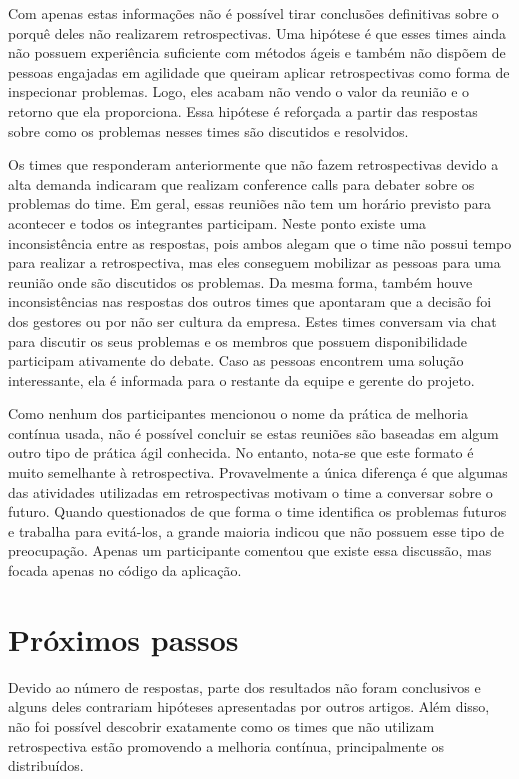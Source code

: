 \documentclass[12pt]{article}
\begin{document}
Com apenas estas informações não é possível tirar conclusões definitivas sobre o porquê deles não realizarem retrospectivas. Uma hipótese é que esses times ainda não possuem experiência suficiente com métodos ágeis e também não dispõem de pessoas engajadas em agilidade que queiram aplicar retrospectivas como forma de inspecionar problemas. Logo, eles acabam não vendo o valor da reunião e o retorno que ela proporciona. Essa hipótese é reforçada a partir das respostas sobre como os problemas nesses times são discutidos e resolvidos.

Os times que responderam anteriormente que não fazem retrospectivas devido a alta demanda indicaram que realizam conference calls para debater sobre os problemas do time. Em geral, essas reuniões não tem um horário previsto para acontecer e todos os integrantes participam. Neste ponto existe uma inconsistência entre as respostas, pois ambos alegam que o time não possui tempo para realizar a retrospectiva, mas eles conseguem mobilizar as pessoas para uma reunião onde são discutidos os problemas. Da mesma forma, também houve inconsistências nas respostas dos outros times que apontaram que a decisão foi dos gestores ou por não ser cultura da empresa. Estes times conversam via chat para discutir os seus problemas e os membros que possuem disponibilidade participam ativamente do debate. Caso as pessoas encontrem uma solução interessante, ela é informada para o restante da equipe e gerente do projeto.

Como nenhum dos participantes mencionou o nome da prática de melhoria contínua usada, não é possível concluir se estas reuniões são baseadas em algum outro tipo de prática ágil conhecida. No entanto, nota-se que este formato é muito semelhante à retrospectiva. Provavelmente a única diferença é que algumas das atividades utilizadas em retrospectivas motivam o time a conversar sobre o futuro. Quando questionados de que forma o time identifica os problemas futuros e trabalha para evitá-los, a grande maioria indicou que não possuem esse tipo de preocupação. Apenas um participante comentou que existe essa discussão, mas focada apenas no código da aplicação.

\section{Próximos passos}

Devido ao número de respostas, parte dos resultados não foram conclusivos e alguns deles contrariam hipóteses apresentadas por outros artigos. Além disso, não foi possível descobrir exatamente como os times que não utilizam retrospectiva estão promovendo a melhoria contínua, principalmente os distribuídos.
\end{document}
